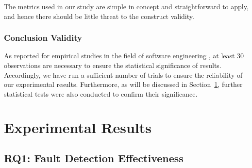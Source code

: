 \documentclass[10pt,journal,compsoc]{IEEEtran}
\begin{document}
The metrics used in our study are simple in concept and straightforward to apply, and hence there should be little threat to the construct validity.

\subsubsection{Conclusion Validity}
\label{sec:conclusion}

As reported for empirical studies in the field of software engineering \cite{arcuri2011practical},  at least 30 observations are necessary to ensure the statistical significance of results.
Accordingly, we have run a sufficient number of trials to ensure the  reliability of our experimental results.
Furthermore, as will be discussed in Section~\ref{sec:results}, further statistical tests were also conducted to confirm their significance.

\section{Experimental Results}
\label{sec:results}

\subsection{RQ1: Fault Detection Effectiveness}
\label{sec:RQ1}
\end{document}
